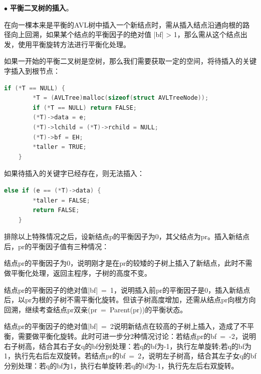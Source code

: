 \vspace{1ex}

\noindent
$\bullet$
\textbf{平衡二叉树的插入}。

在向一棵本来是平衡的AVL树中插入一个新结点时，需从插入结点沿通向根的路径向上回溯，如果某个结点的平衡因子的绝对值 |bf| > 1，那么需从这个结点出发，使用平衡旋转方法进行平衡化处理。

如果一开始的平衡二叉树是空树，那么我们需要获取一定的空间，将待插入的关键字插入到根节点：


\begin{lstlisting}[language=C, caption={空树的插入}]
    if (*T == NULL) {
        *T = (AVLTree)malloc(sizeof(struct AVLTreeNode));
        if (*T == NULL) return FALSE;
        (*T)->data = e;
        (*T)->lchild = (*T)->rchild = NULL;
        (*T)->bf = EH;
        *taller = TRUE;
    }
\end{lstlisting}

如果待插入的关键字已经存在，则无法插入：


\begin{lstlisting}[language=C, caption={待插入的关键字已存在}]
    else if (e == (*T)->data) {
        *taller = FALSE;
        return FALSE;
    }
\end{lstlisting}

排除以上特殊情况之后，设新结点p的平衡因子为0，其父结点为pr。插入新结点后，pr的平衡因子值有三种情况：

结点pr的平衡因子为0，说明刚才是在pr的较矮的子树上插入了新结点，此时不需做平衡化处理，返回主程序，子树的高度不变。

结点pr的平衡因子的绝对值|bf|\ =\ 1，说明插入前pr的平衡因子是0，插入新结点后，以pr为根的子树不需平衡化旋转。但该子树高度增加，还需从结点pr向根方向回溯，继续考查结点pr双亲(pr\ =\ Parent(pr))的平衡状态。

结点pr的平衡因子的绝对值|bf|\ =\ 2说明新结点在较高的子树上插入，造成了不平衡，需要做平衡化旋转。此时可进一步分2种情况讨论：若结点pr的bf\ =\ -2，说明右子树高，结合其右子女q的bf分别处理：若q的bf为-1，执行左单旋转;若q的bf为1，执行先右后左双旋转。若结点pr的bf\ =\ 2，说明左子树高，结合其左子女q的bf分别处理：若q的bf为1，执行右单旋转;若q的bf为-1，执行先左后右双旋转。


